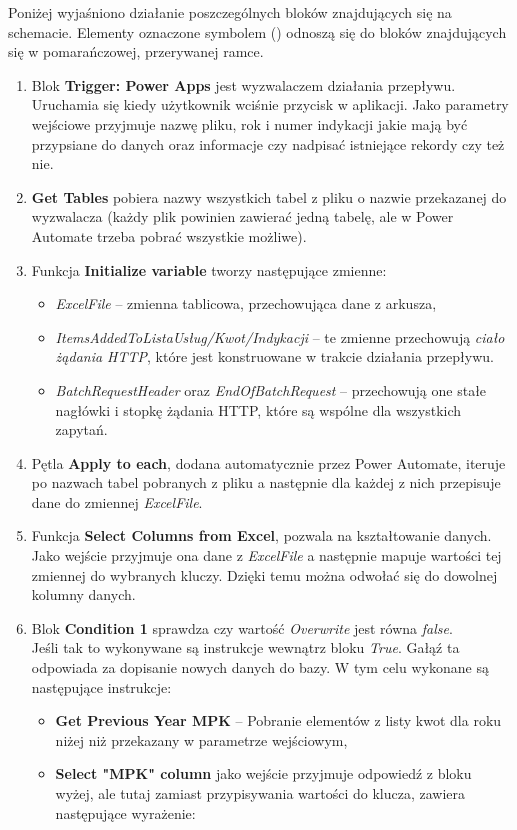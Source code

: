 \pagebreak
Poniżej wyjaśniono działanie poszczególnych bloków znajdujących się na schemacie. Elementy oznaczone symbolem (\textasteriskcentered) odnoszą się do bloków znajdujących się w pomarańczowej, przerywanej ramce.
\begin{enumerate}
    \item Blok \textbf{Trigger: Power Apps} jest wyzwalaczem działania przepływu. Uruchamia się kiedy użytkownik wciśnie przycisk w aplikacji. Jako parametry wejściowe przyjmuje nazwę pliku, rok i numer indykacji jakie mają być przypsiane do danych oraz informacje czy nadpisać istniejące rekordy czy też nie.

    \item \textbf{Get Tables} pobiera nazwy wszystkich tabel z pliku o nazwie przekazanej do wyzwalacza (każdy plik powinien zawierać jedną tabelę, ale w Power Automate trzeba pobrać wszystkie możliwe).
    \item Funkcja \textbf{Initialize variable} tworzy następujące zmienne:
          \begin{itemize}
              \item \emph{ExcelFile} -- zmienna tablicowa, przechowująca dane z arkusza,
              \item \emph{ItemsAddedToListaUsług/Kwot/Indykacji} -- te zmienne przechowują \emph{ciało żądania HTTP}, które jest konstruowane w trakcie działania przepływu.
              \item \emph{BatchRequestHeader} oraz \emph{EndOfBatchRequest} -- przechowują one stałe nagłówki i stopkę żądania HTTP, które są wspólne dla wszystkich zapytań.
          \end{itemize}
    \item Pętla \textbf{Apply to each}, dodana automatycznie przez Power Automate, iteruje po nazwach tabel pobranych z pliku a następnie dla każdej z nich przepisuje dane do zmiennej \emph{ExcelFile}.
    \item Funkcja \textbf{Select Columns from Excel}, pozwala na kształtowanie danych. Jako wejście przyjmuje ona dane z \emph{ExcelFile} a następnie mapuje wartości tej zmiennej do wybranych kluczy. Dzięki temu można odwołać się do dowolnej kolumny danych.
    \item Blok \textbf{Condition 1} sprawdza czy wartość \emph{Overwrite} jest równa \emph{false}. \\
          Jeśli tak to wykonywane są instrukcje wewnątrz bloku \emph{True}. Gałąź ta odpowiada za dopisanie nowych danych do bazy. W tym celu wykonane są następujące instrukcje:
          \begin{itemize}[label=\textasteriskcentered]
              \item \textbf{Get Previous Year MPK} -- Pobranie elementów z listy kwot dla roku niżej niż przekazany w parametrze wejściowym,
              \item \textbf{Select "MPK" column} jako wejście przyjmuje odpowiedź z bloku wyżej, ale tutaj zamiast przypisywania wartości do klucza, zawiera następujące wyrażenie:


\end{itemize}
\end{enumerate}
